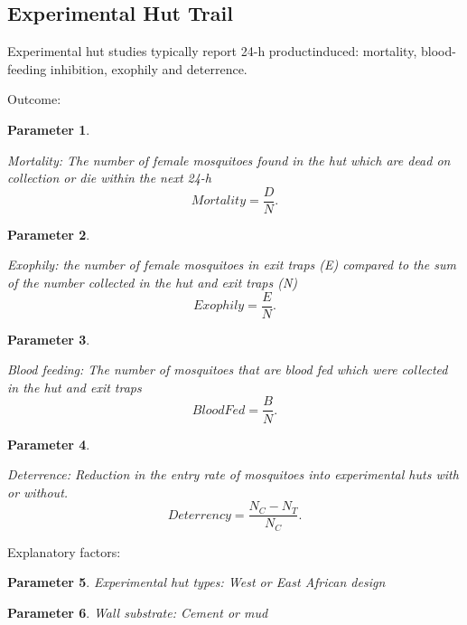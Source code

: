 \documentclass[a4paper, 12pt, twoside]{article}
\newtheorem{parameter}{Parameter}
\begin{document}
\subsection{Experimental Hut Trail}

Experimental hut studies typically report 24-h productinduced: mortality, blood-feeding inhibition, exophily and deterrence.

Outcome:

\begin{parameter}
  \label{eht:mortality} 

  Mortality: The number of female mosquitoes found in the hut which are dead on collection or die within the next 24-h
  \[
  Mortality = \frac{D}{N}
  .\] 
\end{parameter}


\begin{parameter}
  \label{eht:exophily} 

  Exophily: the number of female mosquitoes in exit traps (E) compared to the sum of the number collected in the hut and exit traps (N)
  \[
  Exophily = \frac{E}{N}
  .\] 

\end{parameter}

\begin{parameter}
  \label{eht:blood_fed} 

  Blood feeding: The number of mosquitoes that are blood fed which were collected in the hut and exit traps
  \[
  BloodFed = \frac{B}{N}
  .\] 
\end{parameter}

\begin{parameter}
  \label{eht:Deterrence} 

  Deterrence: Reduction in the entry rate of mosquitoes into experimental huts with or without.
  \[
    Deterrency = \frac{N_C - N_T}{N_C}
  .\] 
\end{parameter}

Explanatory factors:

\begin{parameter}
  \label{eht:experimental_hut_types}
  Experimental hut types: West or East African design
  
\end{parameter}

\begin{parameter}
\label{eht:wall_substrate}
  Wall substrate: Cement or mud
  
\end{parameter}
\end{document}
